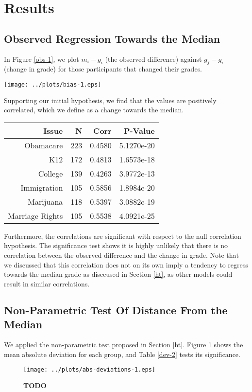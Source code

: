 \section{Results}
\subsection{Observed Regression Towards the Median}
In Figure \ref{obs-1}, we plot $m_i-g_i$ (the observed difference) against $g_f-g_i$ (change in grade) for those participants that changed their grades.
\begin{figure*}[h!]
  \centering
    \texttt{[image: ../plots/bias-1.eps]}
      \caption{\textbf{TODO}}
      \label{obs-1}
\end{figure*}
Supporting our initial hypothesis, we find that the values are positively correlated, which we define as a change towards the median.

\begin{tabular}[!ht] { r | r | r | r }
  Issue & N &Corr & P-Value \\
  \hline
  \hline
  Obamacare & 223 & 0.4580 & 5.1270e-20 \\
  \hline
  K12 & 172 &0.4813 & 1.6573e-18 \\
  \hline
  College & 139 &0.4263 & 3.9772e-13 \\
  \hline
  Immigration & 105 &0.5856 & 1.8984e-20 \\
  \hline
  Marijuana & 118 &0.5397 & 3.0882e-19 \\
  \hline
  Marriage Rights & 105 & 0.5538 & 4.0921e-25 \\
\end{tabular}

Furthermore, the correlations are significant with respect to the null correlation hypothesis.
The significance test shows it is highly unlikely that there is no correlation between the observed difference and the change in grade.
Note that we discussed that this correlation does not on its own imply a tendency to regress towards the median grade as disccused in Section \ref{ht}, as other models could result in similar correlations.

\subsection{Non-Parametric Test Of Distance From the Median}
We applied the non-parametric test proposed in Section \ref{ht}. 
Figure \ref{dev-1} shows the mean absolute deviation for each group, and Table \ref{dev-2} tests its significance.
\begin{figure}[h!]
  \centering
    \texttt{[image: ../plots/abs-deviations-1.eps]}
      \caption{\textbf{TODO}}
      \label{dev-1}
\end{figure}

